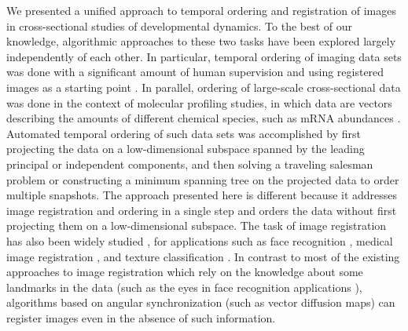 \documentclass{pnastwo}
\begin{document}
\begin{article}
We presented a unified approach to temporal ordering and registration of images in cross-sectional studies of developmental dynamics. 
%
To the best of our knowledge, algorithmic approaches to these two tasks have been explored largely independently of each other. 
%
In particular, temporal ordering of imaging data sets was done with a significant amount of human supervision and using registered images as a starting point \cite{yuan2014automated, surkova2008characterization}.  
%
In parallel, ordering of large-scale cross-sectional data was done in the context of molecular profiling studies, in which data are vectors describing the amounts of different chemical species, such as mRNA abundances \cite{anavy2014blind, trapnell2014dynamics, gupta2008extracting}. 
%
Automated temporal ordering of such data sets was accomplished by first projecting the data on a low-dimensional subspace spanned by the leading principal or independent components, and then solving a traveling salesman problem or constructing a minimum spanning tree on the projected data to order multiple snapshots. 
%
The approach presented here is different because it addresses image registration and ordering in a single step and orders the data without first projecting them on a low-dimensional subspace. 
%
The task of image registration has also been widely studied \cite{zitova2003image}, for applications such as face recognition \cite{rowley1998rotation}, medical image registration \cite{hajnal2010medical}, and texture classification \cite{greenspan1994rotation}.
%
In contrast to most of the existing approaches to image registration which rely on the knowledge about some landmarks in the data \cite{ian1998statistical} (such as the eyes in face recognition applications \cite{zhao2003face}), algorithms based on angular synchronization (such as vector diffusion maps) can register images even in the absence of such information. 


\end{article}
\end{document}
